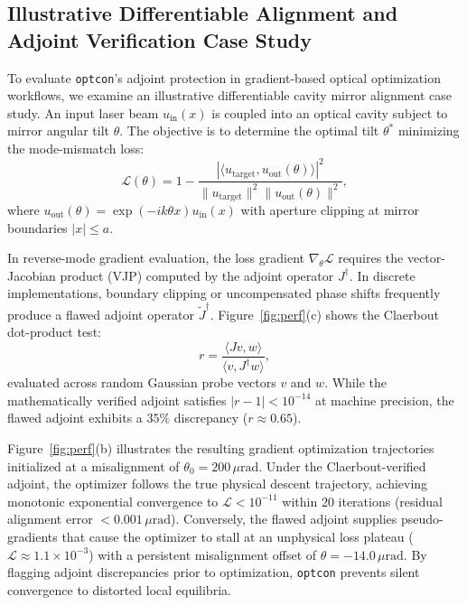 \documentclass[preprint,12pt]{elsarticle}
\begin{document}
\subsection{Illustrative Differentiable Alignment and Adjoint Verification Case Study}

To evaluate \texttt{optcon}'s adjoint protection in gradient-based optical optimization workflows, we examine an illustrative differentiable cavity mirror alignment case study. An input laser beam $u_{\mathrm{in}}(x)$ is coupled into an optical cavity subject to mirror angular tilt $\theta$. The objective is to determine the optimal tilt $\theta^*$ minimizing the mode-mismatch loss:
\begin{equation}
\mathcal{L}(\theta) = 1 - \frac{|\langle u_{\mathrm{target}}, u_{\mathrm{out}}(\theta) \rangle|^2}{\|u_{\mathrm{target}}\|^2 \|u_{\mathrm{out}}(\theta)\|^2},
\end{equation}
where $u_{\mathrm{out}}(\theta) = \exp(-i k \theta x) u_{\mathrm{in}}(x)$ with aperture clipping at mirror boundaries $|x| \le a$.

In reverse-mode gradient evaluation, the loss gradient $\nabla_\theta \mathcal{L}$ requires the vector-Jacobian product (VJP) computed by the adjoint operator $J^\dagger$. In discrete implementations, boundary clipping or uncompensated phase shifts frequently produce a flawed adjoint operator $\tilde{J}^\dagger$. Figure~\ref{fig:perf}(c) shows the Claerbout dot-product test:
\begin{equation}
r = \frac{\langle J v, w \rangle}{\langle v, J^\dagger w \rangle},
\end{equation}
evaluated across random Gaussian probe vectors $v$ and $w$. While the mathematically verified adjoint satisfies $|r - 1| < 10^{-14}$ at machine precision, the flawed adjoint exhibits a $35\%$ discrepancy ($r \approx 0.65$).

Figure~\ref{fig:perf}(b) illustrates the resulting gradient optimization trajectories initialized at a misalignment of $\theta_0 = 200\,\mu\mathrm{rad}$. Under the Claerbout-verified adjoint, the optimizer follows the true physical descent trajectory, achieving monotonic exponential convergence to $\mathcal{L} < 10^{-11}$ within 20 iterations (residual alignment error $< 0.001\,\mu\mathrm{rad}$). Conversely, the flawed adjoint supplies pseudo-gradients that cause the optimizer to stall at an unphysical loss plateau ($\mathcal{L} \approx 1.1 \times 10^{-3}$) with a persistent misalignment offset of $\theta = -14.0\,\mu\mathrm{rad}$. By flagging adjoint discrepancies prior to optimization, \texttt{optcon} prevents silent convergence to distorted local equilibria.
\end{document}
